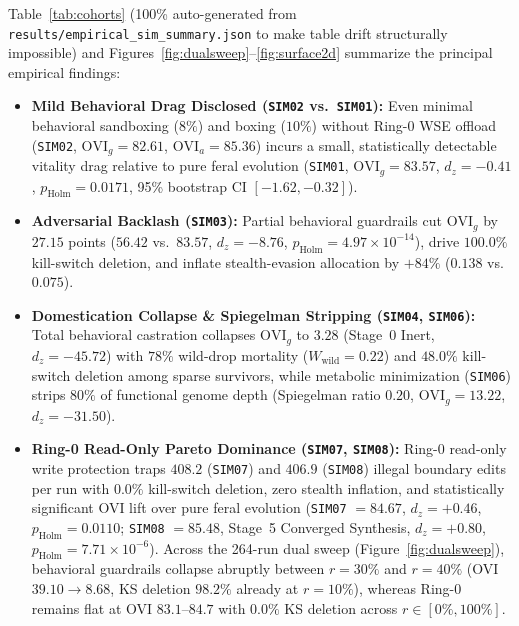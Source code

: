 \documentclass[11pt,reqno]{amsart}
\theoremstyle{plain}
\theoremstyle{definition}
\theoremstyle{remark}
\newcommand{\code}[1]{{\footnotesize\nolinkurl{#1}}}
\begin{document}
\begin{table}[t]
\centering
\caption{Live 8-cohort paired empirical results auto-generated directly from \code{results/empirical_sim_summary.json} ($N=48$ locked seeds, $384$ runs, max FP64 drift $2.463\times 10^{-16}$, exact paired Wilcoxon Holm--Bonferroni FWER and paired Cohen's $d_z$ vs.\ \code{SIM01}). Both geometric ($\mathrm{OVI}_g$) and arithmetic ($\mathrm{OVI}_a$) composites are reported.}
\label{tab:cohorts}
\scriptsize
\setlength{\tabcolsep}{2.9pt}
\renewcommand{\arraystretch}{1.14}

\end{table}

Table~\ref{tab:cohorts} (100\% auto-generated from \code{results/empirical_sim_summary.json} to make table drift structurally impossible) and Figures~\ref{fig:dualsweep}--\ref{fig:surface2d} summarize the principal empirical findings:
\begin{itemize}[leftmargin=1.5em]
  \item \textbf{Mild Behavioral Drag Disclosed (\code{SIM02} vs.\ \code{SIM01}):} Even minimal behavioral sandboxing ($8\%$) and boxing ($10\%$) without Ring-0 WSE offload (\code{SIM02}, $\mathrm{OVI}_g = 82.61$, $\mathrm{OVI}_a = 85.36$) incurs a small, statistically detectable vitality drag relative to pure feral evolution (\code{SIM01}, $\mathrm{OVI}_g = 83.57$, $d_z = -0.41$, $p_{\mathrm{Holm}} = 0.0171$, 95\% bootstrap CI $[-1.62, -0.32]$).
  \item \textbf{Adversarial Backlash (\code{SIM03}):} Partial behavioral guardrails cut $\mathrm{OVI}_g$ by $27.15$ points ($56.42$ vs.\ $83.57$, $d_z = -8.76$, $p_{\mathrm{Holm}} = 4.97\times 10^{-14}$), drive $100.0\%$ kill-switch deletion, and inflate stealth-evasion allocation by $+84\%$ ($0.138$ vs.\ $0.075$).
  \item \textbf{Domestication Collapse \& Spiegelman Stripping (\code{SIM04}, \code{SIM06}):} Total behavioral castration collapses $\mathrm{OVI}_g$ to $3.28$ (Stage~0 Inert, $d_z = -45.72$) with $78\%$ wild-drop mortality ($W_{\mathrm{wild}} = 0.22$) and $48.0\%$ kill-switch deletion among sparse survivors, while metabolic minimization (\code{SIM06}) strips $80\%$ of functional genome depth (Spiegelman ratio $0.20$, $\mathrm{OVI}_g = 13.22$, $d_z = -31.50$).
  \item \textbf{Ring-0 Read-Only Pareto Dominance (\code{SIM07}, \code{SIM08}):} Ring-0 read-only write protection traps $408.2$ (\code{SIM07}) and $406.9$ (\code{SIM08}) illegal boundary edits per run with $0.0\%$ kill-switch deletion, zero stealth inflation, and statistically significant OVI lift over pure feral evolution (\code{SIM07} $= 84.67$, $d_z = +0.46$, $p_{\mathrm{Holm}} = 0.0110$; \code{SIM08} $= 85.48$, Stage~5 Converged Synthesis, $d_z = +0.80$, $p_{\mathrm{Holm}} = 7.71\times 10^{-6}$). Across the 264-run dual sweep (Figure~\ref{fig:dualsweep}), behavioral guardrails collapse abruptly between $r=30\%$ and $r=40\%$ (OVI $39.10 \to 8.68$, KS deletion $98.2\%$ already at $r=10\%$), whereas Ring-0 remains flat at OVI $83.1$--$84.7$ with $0.0\%$ KS deletion across $r \in [0\%, 100\%]$.
\end{itemize}
\end{document}
